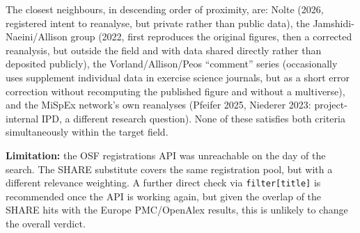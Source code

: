 The closest neighbours, in descending order of proximity, are: Nolte (2026, registered intent to reanalyse, but private rather than public data), the Jamshidi-Naeini/Allison group (2022, first reproduces the original figures, then a corrected reanalysis, but outside the field and with data shared directly rather than deposited publicly), the Vorland/Allison/Peos ``comment'' series (occasionally uses supplement individual data in exercise science journals, but as a short error correction without recomputing the published figure and without a multiverse), and the MiSpEx network's own reanalyses (Pfeifer 2025, Niederer 2023: project-internal IPD, a different research question). None of these satisfies both criteria simultaneously within the target field.

\textbf{Limitation:} the OSF registrations API was unreachable on the day of the search. The SHARE substitute covers the same registration pool, but with a different relevance weighting. A further direct check via \texttt{filter{[}title{]}} is recommended once the API is working again, but given the overlap of the SHARE hits with the Europe PMC/OpenAlex results, this is unlikely to change the overall verdict.
